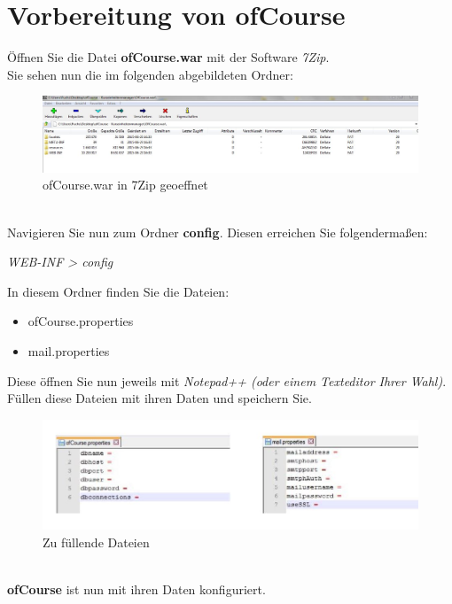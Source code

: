 \documentclass[a4paper, 12pt]{scrreprt}
\begin{document}
\chapter{Vorbereitung von ofCourse}
Öffnen Sie die Datei \textbf{ofCourse.war} mit der Software {\it 7Zip}.\\
Sie sehen nun die im folgenden abgebildeten Ordner:
\begin{figure}[h]
\centering
\includegraphics[width=1.0\linewidth]{Grafiken/7ZipOfCourse1}
\caption{ofCourse.war in 7Zip geoeffnet}
\label{fig:7ZipOfCourse1}
\end{figure}\\
Navigieren Sie nun zum Ordner \textbf{config}. Diesen erreichen Sie folgendermaßen:
\begin{center}
	{\it WEB-INF > config}
\end{center}
In diesem Ordner finden Sie die Dateien:
\begin{itemize}
	\item ofCourse.properties
	\item mail.properties
\end{itemize}
Diese öffnen Sie nun jeweils mit {\it Notepad++ (oder einem Texteditor Ihrer Wahl)}. Füllen diese Dateien mit ihren Daten und speichern Sie. 
\begin{figure}[h]
\centering
\includegraphics[width=0.7\linewidth]{Grafiken/propertiesComplete}
\caption{Zu füllende Dateien}
\label{fig:propertiesComplete}
\end{figure}\ \\
\textbf{ofCourse} ist nun mit ihren Daten konfiguriert.\\
\end{document}
